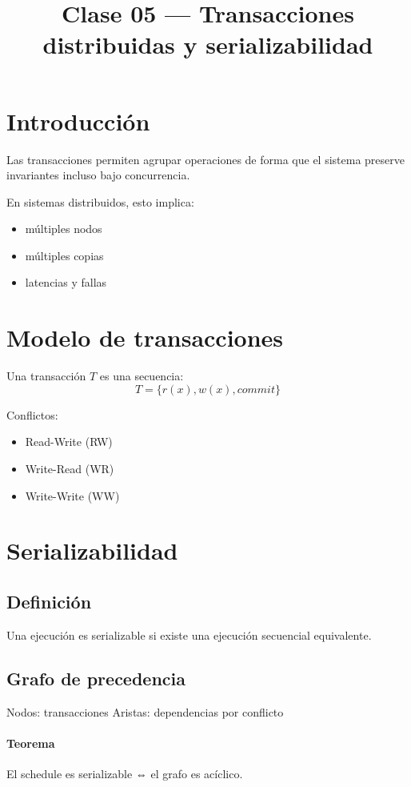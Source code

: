 \documentclass[variant=apuntes,cover=institutional,mode=screen]{ua-engineering-v6-article}
\title{Clase 05 --- Transacciones distribuidas y serializabilidad}
\author{\UAProfessor}
\date{\UADate}
\begin{document}
\maketitle

\section{Introducción}

Las transacciones permiten agrupar operaciones de forma que el sistema preserve invariantes incluso bajo concurrencia.

En sistemas distribuidos, esto implica:
\begin{itemize}
\item múltiples nodos
\item múltiples copias
\item latencias y fallas
\end{itemize}

\section{Modelo de transacciones}

Una transacción $T$ es una secuencia:
\[
T = \{r(x), w(x), commit\}
\]

Conflictos:
\begin{itemize}
\item Read-Write (RW)
\item Write-Read (WR)
\item Write-Write (WW)
\end{itemize}

\section{Serializabilidad}

\subsection{Definición}
Una ejecución es serializable si existe una ejecución secuencial equivalente.

\subsection{Grafo de precedencia}

Nodos: transacciones  
Aristas: dependencias por conflicto

\paragraph{Teorema}
El schedule es serializable ⇔ el grafo es acíclico.
\end{document}
